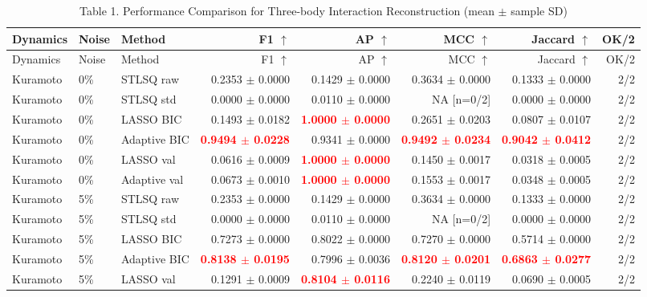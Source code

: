 \documentclass{article}
\begin{document}
\begin{longtable}{lllrrrrr}
\caption{Table 1. Performance Comparison for Three-body Interaction Reconstruction (mean $\pm$ sample SD)}\\
\toprule
Dynamics & Noise & Method & F1 $\uparrow$ & AP $\uparrow$ & MCC $\uparrow$ & Jaccard $\uparrow$ & OK/2 \\
\midrule
\endfirsthead
\toprule
Dynamics & Noise & Method & F1 $\uparrow$ & AP $\uparrow$ & MCC $\uparrow$ & Jaccard $\uparrow$ & OK/2 \\
\midrule
\endhead
\bottomrule
\endfoot
Kuramoto & 0\% & STLSQ raw & 0.2353 $\pm$ 0.0000 & 0.1429 $\pm$ 0.0000 & 0.3634 $\pm$ 0.0000 & 0.1333 $\pm$ 0.0000 & 2/2 \\
Kuramoto & 0\% & STLSQ std & 0.0000 $\pm$ 0.0000 & 0.0110 $\pm$ 0.0000 & NA [n=0/2] & 0.0000 $\pm$ 0.0000 & 2/2 \\
Kuramoto & 0\% & LASSO BIC & 0.1493 $\pm$ 0.0182 & \textcolor{red}{\textbf{1.0000 $\pm$ 0.0000}} & 0.2651 $\pm$ 0.0203 & 0.0807 $\pm$ 0.0107 & 2/2 \\
Kuramoto & 0\% & Adaptive BIC & \textcolor{red}{\textbf{0.9494 $\pm$ 0.0228}} & 0.9341 $\pm$ 0.0000 & \textcolor{red}{\textbf{0.9492 $\pm$ 0.0234}} & \textcolor{red}{\textbf{0.9042 $\pm$ 0.0412}} & 2/2 \\
Kuramoto & 0\% & LASSO val & 0.0616 $\pm$ 0.0009 & \textcolor{red}{\textbf{1.0000 $\pm$ 0.0000}} & 0.1450 $\pm$ 0.0017 & 0.0318 $\pm$ 0.0005 & 2/2 \\
Kuramoto & 0\% & Adaptive val & 0.0673 $\pm$ 0.0010 & \textcolor{red}{\textbf{1.0000 $\pm$ 0.0000}} & 0.1553 $\pm$ 0.0017 & 0.0348 $\pm$ 0.0005 & 2/2 \\
\midrule
Kuramoto & 5\% & STLSQ raw & 0.2353 $\pm$ 0.0000 & 0.1429 $\pm$ 0.0000 & 0.3634 $\pm$ 0.0000 & 0.1333 $\pm$ 0.0000 & 2/2 \\
Kuramoto & 5\% & STLSQ std & 0.0000 $\pm$ 0.0000 & 0.0110 $\pm$ 0.0000 & NA [n=0/2] & 0.0000 $\pm$ 0.0000 & 2/2 \\
Kuramoto & 5\% & LASSO BIC & 0.7273 $\pm$ 0.0000 & 0.8022 $\pm$ 0.0000 & 0.7270 $\pm$ 0.0000 & 0.5714 $\pm$ 0.0000 & 2/2 \\
Kuramoto & 5\% & Adaptive BIC & \textcolor{red}{\textbf{0.8138 $\pm$ 0.0195}} & 0.7996 $\pm$ 0.0036 & \textcolor{red}{\textbf{0.8120 $\pm$ 0.0201}} & \textcolor{red}{\textbf{0.6863 $\pm$ 0.0277}} & 2/2 \\
Kuramoto & 5\% & LASSO val & 0.1291 $\pm$ 0.0009 & \textcolor{red}{\textbf{0.8104 $\pm$ 0.0116}} & 0.2240 $\pm$ 0.0119 & 0.0690 $\pm$ 0.0005 & 2/2 \\

\end{longtable}
\end{document}
